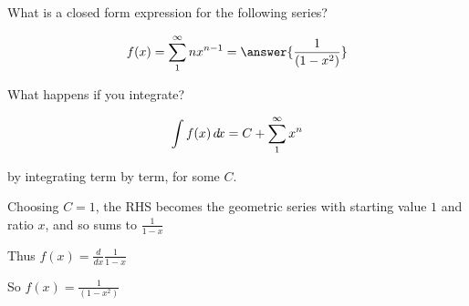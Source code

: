 \documentclass{ximera}
\begin{document}
\begin{example}
	
	What is a closed form expression for the following series?
		
	\[
	f(x) = \sum_1^\infty nx^{n-1} = \answer{\frac{1}{(1-x^2)}}
	\]
	
	\begin{hint}
		What happens if you integrate?
	\end{hint}
	
	\begin{hint}
		\[
		\int f(x) \mathop{}\!d\! x = C+  \sum_1^\infty x^n
		\]
		
		by integrating term by term, for some $C$.
	\end{hint}
	
	\begin{hint}
		Choosing $C = 1$, the RHS becomes the geometric series with starting value $1$ and ratio $x$, and so sums to $\frac{1}{1-x}$ 
	\end{hint}
	
	\begin{hint}
		Thus $f(x) = \frac{d}{dx} \frac{1}{1-x}$
	\end{hint}
	
	\begin{hint}
		So $f(x) = \frac{1}{(1-x^2)}$
	\end{hint}
	

\end{example}
\end{document}
